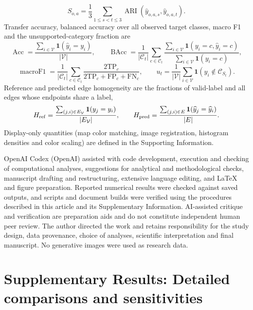 \documentclass[11pt]{article}
\begin{document}
\begin{equation}
S_{o,a}=\frac13\sum_{1\leq s<t\leq3}\operatorname{ARI}(\widehat y_{o,a,s},\widehat y_{o,a,t}).\label{eq:stability}
\end{equation}
Transfer accuracy, balanced accuracy over all observed target classes, macro F1 and the unsupported-category fraction are
\begin{equation}
\operatorname{Acc}=\frac{\sum_{i\in\mathcal V}\mathbf1(\widehat y_i=y_i)}{|\mathcal V|},\qquad
\operatorname{BAcc}=\frac{1}{|\mathcal C_t|}\sum_{c\in\mathcal C_t}
\frac{\sum_{i\in\mathcal V}\mathbf1(y_i=c,\widehat y_i=c)}{\sum_{i\in\mathcal V}\mathbf1(y_i=c)},\label{eq:accuracy}
\end{equation}
\begin{equation}
\operatorname{macroF1}=\frac{1}{|\mathcal C_t|}\sum_{c\in\mathcal C_t}
\frac{2\mathrm{TP}_c}{2\mathrm{TP}_c+\mathrm{FP}_c+\mathrm{FN}_c},\qquad
u_t=\frac{1}{|\mathcal V|}\sum_{i\in\mathcal V}\mathbf1(y_i\notin\mathcal C_{S_t}).\label{eq:f1}
\end{equation}
Reference and predicted edge homogeneity are the fractions of valid-label and all edges whose endpoints share a label,
\begin{equation}
H_{\rm ref}=\frac{\sum_{(j,i)\in E_{\mathcal V}}\mathbf1(y_j=y_i)}{|E_{\mathcal V}|},\qquad
H_{\rm pred}=\frac{\sum_{(j,i)\in E}\mathbf1(\widehat y_j=\widehat y_i)}{|E|}.\label{eq:homogeneity}
\end{equation}
Display-only quantities (map color matching, image registration, histogram densities and color scaling) are defined in the Supporting Information.


OpenAI Codex (OpenAI) assisted with code development, execution and checking of computational analyses, suggestions for analytical and methodological checks, manuscript drafting and restructuring, extensive language editing, and LaTeX and figure preparation. Reported numerical results were checked against saved outputs, and scripts and document builds were verified using the procedures described in this article and its Supplementary Information. AI-assisted critique and verification are preparation aids and do not constitute independent human peer review. The author directed the work and retains responsibility for the study design, data provenance, choice of analyses, scientific interpretation and final manuscript. No generative images were used as research data.

\section*{Supplementary Results: Detailed comparisons and sensitivities}
\end{document}
